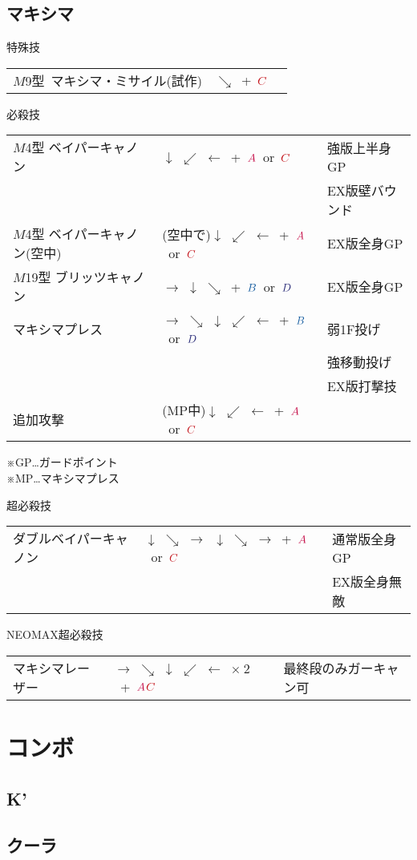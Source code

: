 \documentclass[a4j,11pt]{jarticle}
\def\A{$\textcolor{Acolor}{A}$}
\def\C{$\textcolor{Ccolor}{C}$}
\def\B{$\textcolor{Bcolor}{B}$}
\def\D{$\textcolor{Dcolor}{D}$}
\def\hado{$\downarrow$ $\searrow$ $\rightarrow$}%
\def\tatsu{$\downarrow$ $\swarrow$ $\leftarrow$}%
\def\syoryu{$\rightarrow$ $\downarrow$ $\searrow$}%
\def\gyakuyoga{$\rightarrow$ $\searrow$ $\downarrow$ $\swarrow$ $\leftarrow$}%
\begin{document}
\subsection{マキシマ}
\begin{itembox}[l]{特殊技}
\begin{tabular}{lll}
$M$9型\ マキシマ・ミサイル(試作)&$\searrow$\ +\ \C&%
\end{tabular}
\end{itembox}
\begin{itembox}[l]{必殺技}
\begin{tabular}{lll}
$M$4型 ベイパーキャノン&\tatsu\ +\ \A\ or\ \C&強版上半身GP\\%
&&EX版壁バウンド\\
$M$4型 ベイパーキャノン(空中)&(空中で)\tatsu\ +\ \A\ or\ \C&EX版全身GP\\%
$M$19型 ブリッツキャノン&\syoryu\ +\ \B\ or\ \D&EX版全身GP\\%
マキシマプレス&\gyakuyoga\ +\ \B\ or\ \D&弱1F投げ\\%
&&強移動投げ\\
&&EX版打撃技\\
追加攻撃&(MP中)\tatsu\ +\ \A\ or\ \C&
\end{tabular}
\end{itembox}
※GP…ガードポイント\\
※MP…マキシマプレス\\
\begin{itembox}[l]{超必殺技}
\begin{tabular}{lll}
ダブルベイパーキャノン&\hado\ \hado\ +\ \A\ or\ \C&通常版全身GP\\%
&&EX版全身無敵
\end{tabular}
\end{itembox}
\begin{itembox}[l]{NEOMAX超必殺技}
\begin{tabular}{lll}
マキシマレーザー&\gyakuyoga\ $\times\ 2$\ +\ \A\C&最終段のみガーキャン可%
\end{tabular}
\end{itembox}
\newpage
\section{コンボ}
\subsection{K'}
\subsection{クーラ}
\end{document}
